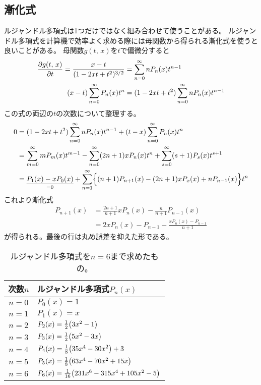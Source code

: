 \documentclass[../../master.tex]{subfiles}
\begin{document}
\subsection{漸化式}
ルジャンドル多項式は1つだけではなく組み合わせて使うことがある。
ルジャンドル多項式を計算機で効率よく求める際には母関数から得られる漸化式を使うと良いことがある。
母関数\(g(t,\,x)\)を\(t\)で偏微分すると
\begin{align}
	\pdv{g(t,\,x)}{t} = \frac{x-t}{(1-2xt+t^2)^{3/2}} & = \sum_{n=0}^{\infty} nP_n(x)t^{n-1}            \\
	(x-t)\sum_{n=0}^{\infty} P_n(x) t^n               & = (1-2xt+t^2)\sum_{n=0}^{\infty} nP_n(x)t^{n-1} \\
\end{align}
この式の両辺の\(t\)の次数について整理する。
\begin{align}
	0 & = (1-2xt+t^2)\sum_{n=0}^{\infty} nP_n(x)t^{n-1} +(t-x)\sum_{n=0}^{\infty} P_n(x) t^n \\
	  & = \sum_{m=0}^{\infty} mP_m(x)t^{m-1}
	- \sum_{n=0}^{\infty}(2n+1)xP_n(x)t^n
	+ \sum_{s=0}^{\infty} (s+1)P_s(x)t^{s+1}                                                 \\
	  & = \underset{=0}{\underline{P_1(x) -xP_0(x)}}+
	\sum_{n=1}^{\infty} \Bigl\{
	(n+1)P_{n+1}(x) - (2n+1)xP_x(x) + nP_{n-1}(x)
	\Bigr\}t^n
\end{align}
これより漸化式
\begin{align}
	P_{n+1}(x) & = \frac{2n+1}{n+1}xP_n(x)-\frac{n}{n+1}P_{n-1}(x) \label{eq:legendre_recurrece1} \\
	           & = 2xP_n(x)-P_{n-1} -\frac{xP_n(x)-P_{n-1}}{n+1}
\end{align}
が得られる。最後の行は丸め誤差を抑えた形である。

\begin{table}[htb]
	\centering
	\caption{ルジャンドル多項式を\(n=6\)まで求めたもの。}
	\begin{tabular}{cl}
		\hline
		次数\(n\) & ルジャンドル多項式\(P_n(x)\)                                  \\
		\hline \hline
		\(n=0\) & \(P_0(x)= 1\)                                        \\
		\(n=1\) & \(P_1(x)= x\)                                        \\
		\(n=2\) & \(P_2(x)= \frac{1}{2}\qty(3x^2-1)\)                  \\
		\(n=3\) & \(P_3(x)= \frac{1}{2}\qty(5x^2-3x)\)                 \\
		\(n=4\) & \(P_4(x)= \frac{1}{8}\qty(35x^4-30x^2)+3\)           \\
		\(n=5\) & \(P_5(x)= \frac{1}{8}\qty(63x^4-70x^2+15x)\)         \\
		\(n=6\) & \(P_6(x)= \frac{1}{16}\qty(231x^6-315x^4+105x^2-5)\) \\
		\hline
	\end{tabular}
\end{table}
\end{document}
